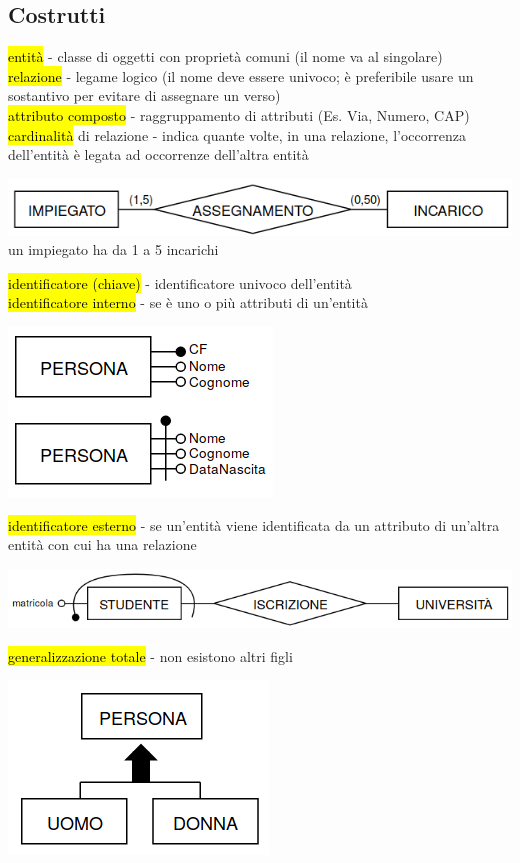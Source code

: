 \documentclass[a4paper]{article}
\begin{document}
\subsection{Costrutti}
\hl{entità} - classe di oggetti con proprietà comuni (il nome va al singolare)\medskip\\
\hl{relazione} - legame logico (il nome deve essere univoco; è preferibile usare un sostantivo per evitare di assegnare un verso)\medskip\\
\hl{attributo composto} - raggruppamento di attributi (Es. Via, Numero, CAP)\medskip\\
\hl{cardinalità} di relazione - indica quante volte, in una relazione, l'occorrenza dell'entità è legata ad occorrenze dell'altra entità
\begin{center}
      \includegraphics[scale=0.5]{img/er4.png}\\
      un impiegato ha da 1 a 5 incarichi
    \end{center}
\hl{identificatore (chiave)} - identificatore univoco dell’entità\medskip\\
\hl{identificatore interno} - se è uno o più attributi di un’entità
\begin{center}
      \includegraphics[scale=0.5]{img/er2.png}
\end{center}
\hl{identificatore esterno} - se un’entità viene identificata da un attributo di un’altra entità con cui ha una relazione
\begin{center}
      \includegraphics[scale=0.5]{img/er3.png}
\end{center}
\hl{generalizzazione totale} - non esistono altri figli
\begin{center}
      \includegraphics[scale=0.5]{img/er5.png}
\end{center}
\end{document}
